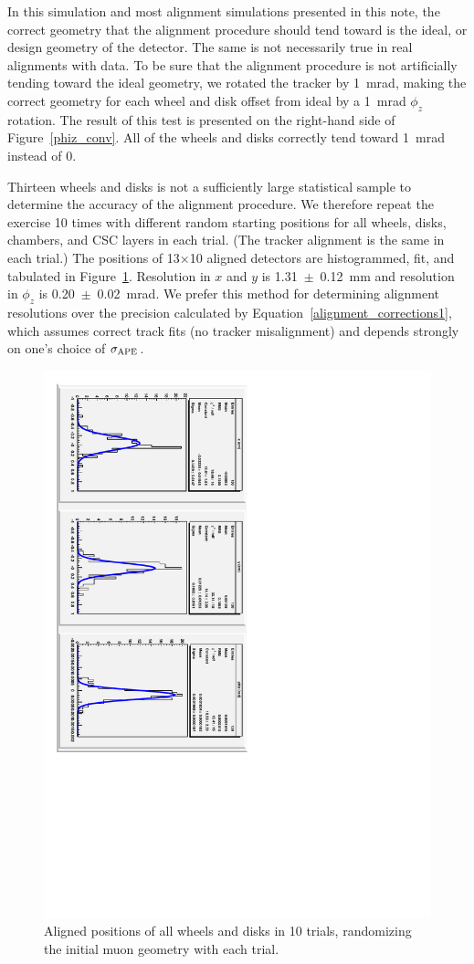 \documentclass[12pt]{article}
\begin{document}
In this simulation and most alignment simulations presented in this
note, the correct geometry that the alignment procedure should tend
toward is the ideal, or design geometry of the detector.  The same is
not necessarily true in real alignments with data.  To be sure that
the alignment procedure is not artificially tending toward the ideal
geometry, we rotated the tracker by 1~mrad, making the correct
geometry for each wheel and disk offset from ideal by a 1~mrad
$\phi_z$ rotation.  The result of this test is presented on the
right-hand side of Figure~\ref{phiz_conv}.  All of the wheels and
disks correctly tend toward 1~mrad instead of 0.

Thirteen wheels and disks is not a sufficiently large statistical
sample to determine the accuracy of the alignment procedure.  We
therefore repeat the exercise 10 times with different random starting
positions for all wheels, disks, chambers, and CSC layers in each
trial.  (The tracker alignment is the same in each trial.)  The
positions of 13$\times$10 aligned detectors are histogrammed, fit, and
tabulated in Figure~\ref{nominal_fits}.  Resolution in $x$ and $y$ is
1.31~$\pm$~0.12~mm and resolution in $\phi_z$ is 0.20~$\pm$~0.02~mrad.
We prefer this method for determining alignment resolutions over the
precision calculated by Equation~\ref{alignment_corrections1}, which
assumes correct track fits (no tracker misalignment) and depends
strongly on one's choice of $\sigma_{\mbox{\scriptsize APE}}$.

\begin{figure}
\includegraphics[height=\linewidth, angle=90]{disk_alignment/nominal_fits_color.pdf}

\caption{\label{nominal_fits} Aligned positions of all wheels and
  disks in 10 trials, randomizing the initial muon geometry with each
  trial.}
\end{figure}
\end{document}

